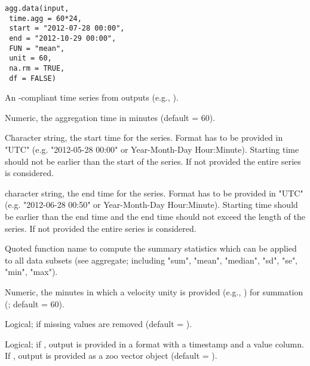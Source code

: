 \documentclass[a4paper]{book}
\begin{document}
%
\begin{Usage}
\begin{verbatim}
agg.data(input,
 time.agg = 60*24,
 start = "2012-07-28 00:00",
 end = "2012-10-29 00:00",
 FUN = "mean",
 unit = 60,
 na.rm = TRUE,
 df = FALSE)
\end{verbatim}
\end{Usage}
%
\begin{Arguments}
\begin{ldescription}
\item[\code{input}] An -compliant time series from  outputs
(e.g., ).

\item[\code{time.agg}] Numeric, the aggregation time in minutes (default = 60).

\item[\code{start}] Character string, the start time for the series. Format has
to be provided in "UTC" (e.g. "2012-05-28 00:00" or Year-Month-Day Hour:Minute).
Starting time should not be earlier than the start of the series.
If not provided the entire series is considered.

\item[\code{end}] character string, the end time for the series.
Format has to be provided in "UTC" (e.g. "2012-06-28 00:50" or Year-Month-Day Hour:Minute).
Starting time should be earlier than the end time and the end time should not exceed the
length of the series.  If not provided the entire series is considered.

\item[\code{FUN}] Quoted function name to compute the summary statistics which can be
applied to all data subsets (see aggregate; including "sum", "mean",
"median", "sd", "se", "min", "max").

\item[\code{unit}] Numeric, the minutes in which a velocity unity is provided
(e.g., ) for summation (; default = 60).

\item[\code{na.rm}] Logical; if  missing values are removed (default = ).

\item[\code{df}] Logical; if , output is provided in a  format
with a timestamp and a value column. If , output
is provided as a zoo vector object (default = ).
\end{ldescription}
\end{Arguments}
\end{document}
